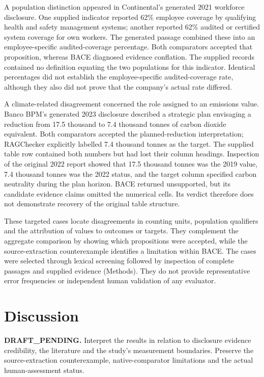 \documentclass[11pt,a4paper]{article}
\begin{document}
A population distinction appeared in Continental's generated 2021 workforce disclosure. One supplied indicator reported 62\% employee coverage by qualifying health and safety management systems; another reported 62\% audited or certified system coverage for own workers. The generated passage combined these into an employee-specific audited-coverage percentage. Both comparators accepted that proposition, whereas BACE diagnosed evidence conflation. The supplied records contained no definition equating the two populations for this indicator. Identical percentages did not establish the employee-specific audited-coverage rate, although they also did not prove that the company's actual rate differed.

A climate-related disagreement concerned the role assigned to an emissions value. Banco BPM's generated 2023 disclosure described a strategic plan envisaging a reduction from 17.5 thousand to 7.4 thousand tonnes of carbon dioxide equivalent. Both comparators accepted the planned-reduction interpretation; RAGChecker explicitly labelled 7.4 thousand tonnes as the target. The supplied table row contained both numbers but had lost their column headings. Inspection of the original 2022 report showed that 17.5 thousand tonnes was the 2019 value, 7.4 thousand tonnes was the 2022 status, and the target column specified carbon neutrality during the plan horizon. BACE returned unsupported, but its candidate evidence claims omitted the numerical cells. Its verdict therefore does not demonstrate recovery of the original table structure.

These targeted cases locate disagreements in counting units, population qualifiers and the attribution of values to outcomes or targets. They complement the aggregate comparison by showing which propositions were accepted, while the source-extraction counterexample identifies a limitation within BACE. The cases were selected through lexical screening followed by inspection of complete passages and supplied evidence (Methods). They do not provide representative error frequencies or independent human validation of any evaluator.

\section*{Discussion}
\textbf{DRAFT\_PENDING.} Interpret the results in relation to disclosure evidence credibility,
the literature and the study's measurement boundaries. Preserve the source-extraction
counterexample, native-comparator limitations and the actual human-assessment status.
\end{document}
